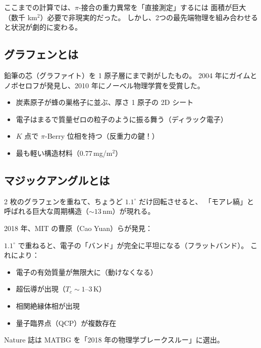 \documentclass[11pt,a4paper]{article}
\begin{document}
ここまでの計算では、$\pi$-接合の重力異常を「直接測定」するには
面積が巨大（数千 km$^2$）必要で非現実的だった。
しかし、2つの最先端物理を組み合わせると状況が劇的に変わる。

\subsection{グラフェンとは}

鉛筆の芯（グラファイト）を 1 原子層にまで剥がしたもの。
2004 年にガイムとノボセロフが発見し、2010 年にノーベル物理学賞を受賞した。

\begin{tcolorbox}[colback=blue!5,colframe=blue!50!black,title=グラフェンの特徴]
\begin{itemize}
\item 炭素原子が蜂の巣格子に並ぶ、厚さ 1 原子の 2D シート
\item 電子はまるで質量ゼロの粒子のように振る舞う（ディラック電子）
\item $K$ 点で $\pi$-Berry 位相を持つ（反重力の鍵！）
\item 最も軽い構造材料（$0.77$\,mg/m$^2$）
\end{itemize}
\end{tcolorbox}

\subsection{マジックアングルとは}

2 枚のグラフェンを重ねて、ちょうど $1.1^\circ$ だけ回転させると、
「モアレ縞」と呼ばれる巨大な周期構造（$\sim 13$\,nm）が現れる。

\begin{tcolorbox}[colback=green!5,colframe=green!50!black,title=MATBG（Magic-Angle Twisted Bilayer Graphene）]
2018 年、MIT の曹原（Cao Yuan）らが発見：

$1.1^\circ$ で重ねると、電子の「バンド」が完全に平坦になる（フラットバンド）。
これにより：
\begin{itemize}
\item 電子の有効質量が無限大に（動けなくなる）
\item 超伝導が出現（$T_c \sim 1$--3\,K）
\item 相関絶縁体相が出現
\item 量子臨界点（QCP）が複数存在
\end{itemize}
Nature 誌は MATBG を「2018 年の物理学ブレークスルー」に選出。
\end{tcolorbox}
\end{document}
